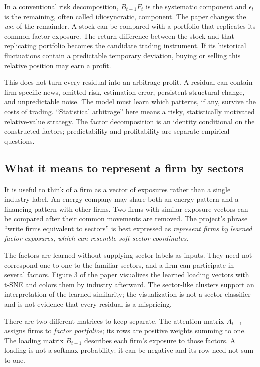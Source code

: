 \documentclass[11pt]{article}
\begin{document}
In a conventional risk decomposition, $B_{t-1}F_t$ is the systematic component
and $\epsilon_t$ is the remaining, often called idiosyncratic, component.
The paper changes the \emph{use} of the remainder. A stock can be compared
with a portfolio that replicates its common-factor exposure. The return
difference between the stock and that replicating portfolio becomes the
candidate trading instrument. If its historical fluctuations contain a
predictable temporary deviation, buying or selling this relative position
may earn a profit.

This does not turn every residual into an arbitrage profit. A residual can
contain firm-specific news, omitted risk, estimation error, persistent
structural change, and unpredictable noise. The model must learn which
patterns, if any, survive the costs of trading. ``Statistical arbitrage'' here
means a risky, statistically motivated relative-value strategy. The
factor decomposition is an identity conditional on the constructed
factors; predictability and profitability are separate empirical questions.

\subsection{What it means to represent a firm by sectors}
\label{sec:soft-sector}

It is useful to think of a firm as a vector of exposures rather than a
single industry label. An energy company may share both an energy pattern
and a financing pattern with other firms. Two firms with similar exposure
vectors can be compared after their common movements are removed. The
project's phrase ``write firms equivalent to sectors'' is best expressed
as \emph{represent firms by learned factor exposures, which can resemble
soft sector coordinates}.

The factors are learned without supplying sector labels as inputs. They
need not correspond one-to-one to the familiar sectors, and a firm can
participate in several factors. Figure 3 of the paper visualizes the
learned loading vectors with t-SNE and colors them by industry afterward.
The sector-like clusters support an interpretation of the learned
similarity; the visualization is not a sector classifier and is not
evidence that every residual is a mispricing.

There are two different matrices to keep separate. The attention matrix
$A_{t-1}$ assigns firms to \emph{factor portfolios}; its rows are positive
weights summing to one. The loading matrix $B_{t-1}$ describes each firm's
exposure to those factors. A loading is not a softmax probability: it
can be negative and its row need not sum to one.
\end{document}
